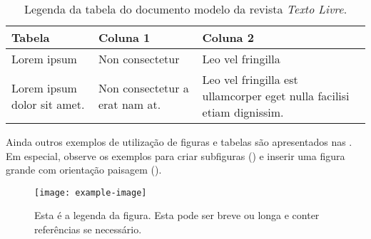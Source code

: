 \documentclass{textolivre}
\begin{document}
\begin{table}[htpb]
\caption{Legenda da tabela do documento modelo da revista \emph{Texto Livre}.}
\label{tbl-tabela-01}
\begin{tabular}{llp{4.3cm}}
\toprule 
Tabela                      & Coluna 1                       & Coluna 2                                                               \\ 
\midrule
Lorem ipsum                 & Non consectetur                & Leo vel fringilla                                                      \\ 
\midrule
Lorem ipsum dolor sit amet. & Non consectetur a erat nam at. & Leo vel fringilla est ullamcorper eget nulla facilisi etiam dignissim. \\ 
\bottomrule
\end{tabular}
\end{table}

\lipsum[3]

Ainda outros exemplos de utilização de figuras e tabelas são apresentados nas . Em especial, observe os exemplos para criar subfiguras () e inserir uma figura grande com orientação paisagem ().

\begin{figure}[htbp]
\centering
\texttt{[image: example-image]}
\caption{Esta é a legenda da figura. Esta pode ser breve ou longa e conter referências se necessário.}
\label{fig:example}
\end{figure}

\lipsum[30-35]
\end{document}
